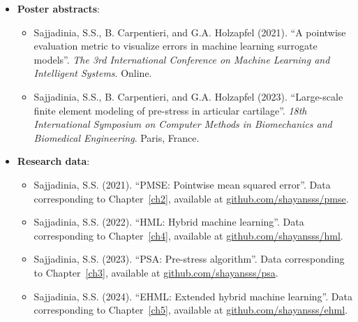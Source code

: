 \begin{itemize}
\begin{itemize}
\end{itemize}
\item \textbf{Poster abstracts}:
\begin{itemize}
    \item Sajjadinia, S.S., B. Carpentieri, and G.A. Holzapfel (2021). ``A pointwise evaluation metric to visualize errors in machine learning surrogate models''. \textit{The 3rd International Conference on Machine Learning and Intelligent Systems}. Online.
    \item Sajjadinia, S.S., B. Carpentieri, and G.A. Holzapfel (2023). ``Large-scale finite element modeling of pre-stress in articular cartilage''. \textit{18th International Symposium on Computer Methods in Biomechanics and Biomedical Engineering}. Paris, France.
\end{itemize}
\item \textbf{Research data}:
\begin{itemize}
    \item Sajjadinia, S.S. (2021). ``PMSE: Pointwise mean squared error''. Data corresponding to Chapter~\ref{ch2}, available at \href{https://github.com/shayansss/pmse}{github.com/shayansss/pmse}.
    \item Sajjadinia, S.S. (2022). ``HML: Hybrid machine learning''. Data corresponding to Chapter~\ref{ch4}, available at \href{https://github.com/shayansss/hml}{github.com/shayansss/hml}.
    \item Sajjadinia, S.S. (2023). ``PSA: Pre-stress algorithm''. Data corresponding to Chapter~\ref{ch3}, available at \href{https://github.com/shayansss/psa}{github.com/shayansss/psa}.
    \item Sajjadinia, S.S. (2024). ``EHML: Extended hybrid machine learning''. Data corresponding to Chapter~\ref{ch5}, available at \href{https://github.com/shayansss/ehml}{github.com/shayansss/ehml}.
\end{itemize}
\end{itemize}

